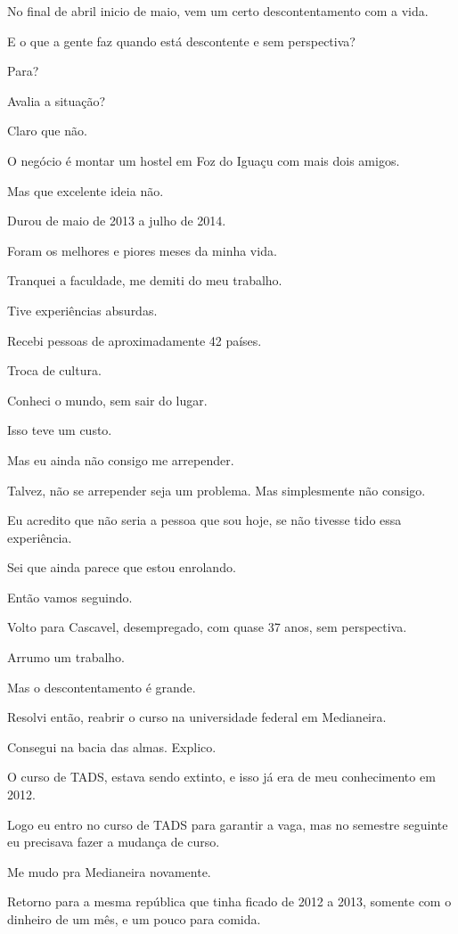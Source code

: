 No final de abril inicio de maio, vem um certo descontentamento com a vida. 

E o que a gente faz quando está descontente e sem perspectiva? 

Para? 

Avalia a situação? 

Claro que não. 

O negócio é montar um hostel em Foz do Iguaçu com mais dois amigos. 

Mas que excelente ideia não. 

Durou de maio de 2013 a julho de 2014. 

Foram os melhores e piores meses da minha vida. 

Tranquei a faculdade, me demiti do meu trabalho. 

Tive experiências absurdas. 

Recebi pessoas de aproximadamente 42 países. 

Troca de cultura. 

Conheci o mundo, sem sair do lugar. 

Isso teve um custo. 

Mas eu ainda não consigo me arrepender. 

Talvez, não se arrepender seja um problema. Mas simplesmente não consigo.

Eu acredito que não seria a pessoa que sou hoje, se não tivesse tido essa experiência.

Sei que ainda parece que estou enrolando. 

Então vamos seguindo. 

Volto para Cascavel, desempregado, com quase 37 anos, sem perspectiva. 

Arrumo um trabalho. 

Mas o descontentamento é grande. 

Resolvi então, reabrir o curso na universidade federal em Medianeira. 

Consegui na bacia das almas. Explico. 

O curso de TADS, estava sendo extinto, e isso já era de meu conhecimento em 2012. 

Logo eu entro no curso de TADS para garantir a vaga, mas no semestre seguinte eu precisava fazer a mudança de curso. 

Me mudo pra Medianeira novamente. 

Retorno para a mesma república que tinha ficado de 2012 a 2013, somente com o dinheiro de um mês, e um pouco para comida. 

